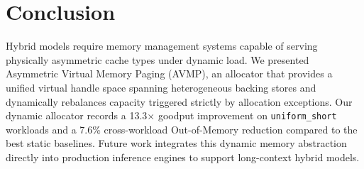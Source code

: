 \section{Conclusion}
\label{sec:conclusion}

Hybrid models require memory management systems capable of serving physically asymmetric cache types under dynamic load. We presented Asymmetric Virtual Memory Paging (AVMP), an allocator that provides a unified virtual handle space spanning heterogeneous backing stores and dynamically rebalances capacity triggered strictly by allocation exceptions. Our dynamic allocator records a 13.3$\times$ goodput improvement on \texttt{uniform\_short} workloads and a 7.6\% cross-workload Out-of-Memory reduction compared to the best static baselines. Future work integrates this dynamic memory abstraction directly into production inference engines to support long-context hybrid models.
